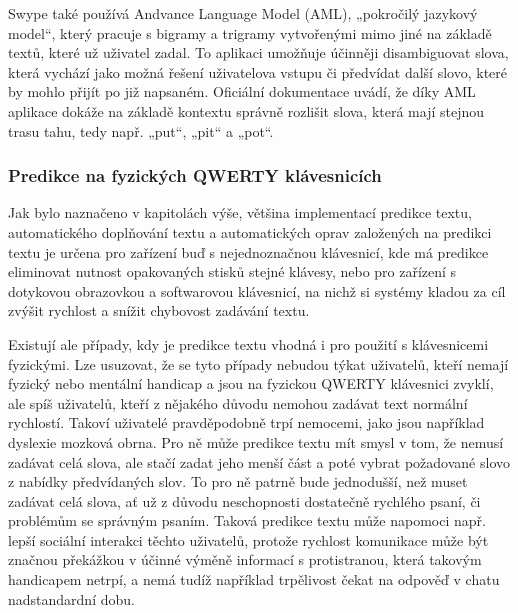 \documentclass[a4paper,11pt]{article}
\begin{document}

Swype také používá Andvance Language Model (AML), „pokročilý jazykový model“, který pracuje s bigramy a trigramy vytvořenými mimo jiné na základě textů, které už uživatel zadal. To aplikaci umožňuje účinněji disambiguovat slova, která vychází jako možná řešení uživatelova vstupu či předvídat další slovo, které by mohlo přijít po již napsaném. Oficiální dokumentace uvádí, že díky AML aplikace dokáže na základě kontextu správně rozlišit slova, která mají stejnou trasu tahu, tedy např. „put“, „pit“ a „pot“. \parencite{swypehowto}

\subsubsection{Predikce na fyzických QWERTY klávesnicích}

Jak bylo naznačeno v kapitolách výše, většina implementací predikce textu, automatického doplňování textu a automatických oprav založených na predikci textu je určena pro zařízení buď s nejednoznačnou klávesnicí, kde má predikce eliminovat nutnost opakovaných stisků stejné klávesy, nebo pro zařízení s dotykovou obrazovkou a softwarovou klávesnicí, na nichž si systémy kladou za cíl zvýšit rychlost a snížit chybovost zadávání textu. 

Existují ale případy, kdy je predikce textu vhodná i pro použití s klávesnicemi fyzickými. Lze usuzovat, že se tyto případy nebudou týkat uživatelů, kteří nemají fyzický nebo mentální handicap a jsou na fyzickou QWERTY klávesnici zvyklí, ale spíš uživatelů, kteří z nějakého důvodu nemohou zadávat text normální rychlostí. Takoví uživatelé pravděpodobně trpí nemocemi, jako jsou například dyslexie mozková obrna. \parencite[1--2]{philgadomski} Pro ně může predikce textu mít smysl v tom, že nemusí zadávat celá slova, ale stačí zadat jeho menší část a poté vybrat požadované slovo z nabídky předvídaných slov. To pro ně patrně bude jednodušší, než muset zadávat celá slova, ať už z důvodu neschopnosti dostatečně rychlého psaní, či problémům se správným psaním. \parencite{penfriend2014} %
Taková predikce textu může napomoci např. lepší sociální interakci těchto uživatelů, protože rychlost komunikace může být značnou překážkou v účinné výměně informací s protistranou, která takovým handicapem netrpí, a nemá tudíž například trpělivost čekat na odpověď v chatu nadstandardní dobu. %
\end{document}
